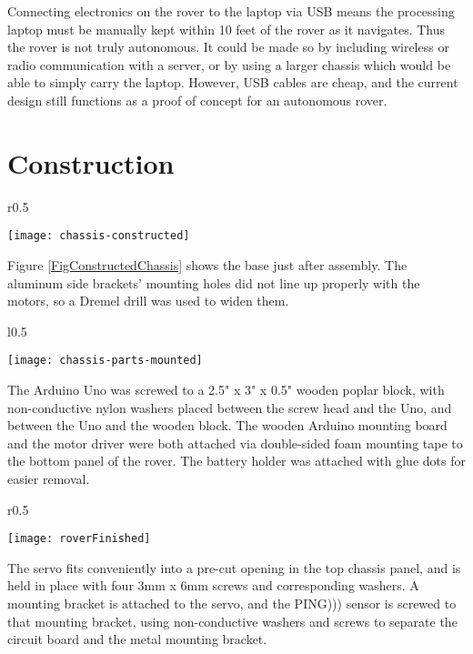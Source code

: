 Connecting electronics on the rover to the laptop via USB means the processing laptop must be manually kept within 10 feet of the rover as it navigates. Thus the rover is not truly autonomous. It could be made so by including wireless or radio communication with a server, or by using a larger chassis which would be able to simply carry the laptop. However, USB cables are cheap, and the current design still functions as a proof of concept for an autonomous rover.

\section{Construction}

\begin{wrapfigure}{r}{0.5\textwidth}
	\caption{Constructed Chassis}
	\centering
	\texttt{[image: chassis-constructed]}
	\label{FigConstructedChassis}
\end{wrapfigure}

Figure \ref{FigConstructedChassis} shows the base just after assembly. The aluminum side brackets' mounting holes did not line up properly with the motors, so a Dremel drill was used to widen them.

\begin{wrapfigure}{l}{0.5\textwidth}
	\caption{Pieces Mounted}
	\centering
	\texttt{[image: chassis-parts-mounted]}
	\label{FigChassisParts}
\end{wrapfigure}

The Arduino Uno was screwed to a 2.5" x 3" x 0.5" wooden poplar block, with non-conductive nylon washers placed between the screw head and the Uno, and between the Uno and the wooden block. The wooden Arduino mounting board and the motor driver were both attached via double-sided foam mounting tape to the bottom panel of the rover. The battery holder was attached with glue dots for easier removal.

\begin{wrapfigure}{r}{0.5\textwidth}
	\caption{Construction Finished}
	\centering
	\texttt{[image: roverFinished]}
	\label{FigRoverFinished}
\end{wrapfigure}

The servo fits conveniently into a pre-cut opening in the top chassis panel, and is held in place with four 3mm x 6mm screws and corresponding washers. A mounting bracket is attached to the servo, and the PING))) sensor is screwed to that mounting bracket, using non-conductive washers and screws to separate the circuit board and the metal mounting bracket.

